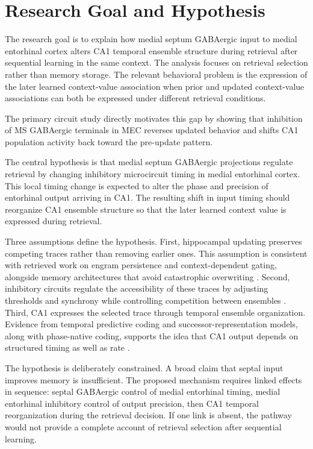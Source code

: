 \section{Research Goal and Hypothesis}

The research goal is to explain how medial septum GABAergic input to medial entorhinal cortex alters CA1 temporal ensemble structure during retrieval after sequential learning in the same context. The analysis focuses on retrieval selection rather than memory storage. The relevant behavioral problem is the expression of the later learned context-value association when prior and updated context-value associations can both be expressed under different retrieval conditions.

The primary circuit study directly motivates this gap by showing that inhibition of MS GABAergic terminals in MEC reverses updated behavior and shifts CA1 population activity back toward the pre-update pattern.

The central hypothesis is that medial septum GABAergic projections regulate retrieval by changing inhibitory microcircuit timing in medial entorhinal cortex. This local timing change is expected to alter the phase and precision of entorhinal output arriving in CA1. The resulting shift in input timing should reorganize CA1 ensemble structure so that the later learned context value is expressed during retrieval.

Three assumptions define the hypothesis. First, hippocampal updating preserves competing traces rather than removing earlier ones. This assumption is consistent with retrieved work on engram persistence and context-dependent gating, alongside memory architectures that avoid catastrophic overwriting \cite{arxiv250601659,arxiv250102950,arxiv220200159}. Second, inhibitory circuits regulate the accessibility of these traces by adjusting thresholds and synchrony while controlling competition between ensembles \cite{arxiv170507614,arxiv181211581,arxiv231019614}. Third, CA1 expresses the selected trace through temporal ensemble organization. Evidence from temporal predictive coding and successor-representation models, along with phase-native coding, supports the idea that CA1 output depends on structured timing as well as rate \cite{arxiv230511982,arxiv200611975,arxiv260319690}.

The hypothesis is deliberately constrained. A broad claim that septal input improves memory is insufficient. The proposed mechanism requires linked effects in sequence: septal GABAergic control of medial entorhinal timing, medial entorhinal inhibitory control of output precision, then CA1 temporal reorganization during the retrieval decision. If one link is absent, the pathway would not provide a complete account of retrieval selection after sequential learning.
